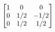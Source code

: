 \documentclass[preview]{standalone}
\begin{document}
\begin{align*}
\special{dvisvgm:raw <g id='unique000'>}
        \begin{bmatrix}
        1 & 0 & 0 \\
        0 & 1/2 & -1/2 \\
        0 & 1/2 & 1/2
        \end{bmatrix}
        \special{dvisvgm:raw </g>}
\end{align*}
\end{document}

